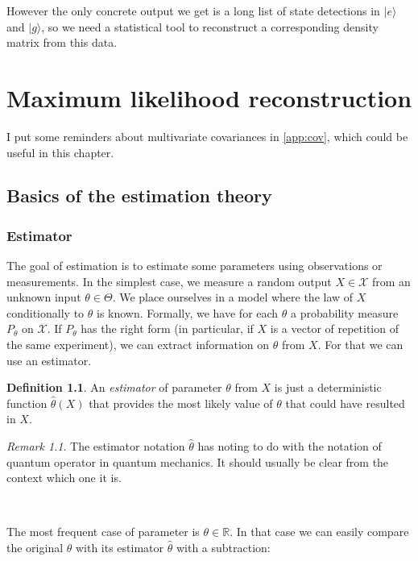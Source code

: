 \documentclass[10pt,a4paper]{report}
\theoremstyle{plain}
\theoremstyle{definition}
\newtheorem{defn}{Definition}[chapter]
\theoremstyle{remark}
\newtheorem*{rem}{Remark}
\newcommand{\R}{\ensuremath{\mathbb{R}}}
\newcommand{\ket}[1]{|#1\rangle}
\begin{document}
However the only concrete output we get is a long list of state detections in
$\ket e$ and
$\ket g$, so we need a statistical tool to reconstruct a corresponding
density matrix from this data.


\chapter{Maximum likelihood reconstruction}

I put some reminders about multivariate covariances in
\cref{app:cov}, which could be useful in this chapter.

\section{Basics of the estimation theory}

\subsection{Estimator}

The goal of estimation is to estimate some parameters using observations or
measurements. In the simplest case, we measure a random output $X \in \mathcal{X}$ from an
unknown input $\theta \in \Theta$. We place ourselves in a model where the law
of $X$ conditionally to $\theta$ is known. Formally, we have for each $\theta$ a
probability measure $P_\theta$ on $\mathcal{X}$. If $P_\theta$ has the right
form (in particular, if $X$ is a vector of repetition of the same experiment), we
can extract information on $\theta$ from $X$. For that we can use an estimator.

\begin{defn}
  An \emph{estimator} of parameter $\theta$ from $X$ is just a deterministic
  function $\hat \theta(X)$ that provides the most likely value of $\theta$ that
  could have resulted in $X$.
\end{defn}

\begin{rem}
  The estimator notation $\hat \theta$ has noting to do with the notation of
  quantum operator in quantum mechanics. It should usually be clear from the
  context which one it is.
\end{rem}

\

The most frequent case of parameter is $\theta \in \R$. In that case we can
easily compare the original $\theta$ with its estimator $\hat \theta$ with a
subtraction:
\end{document}
